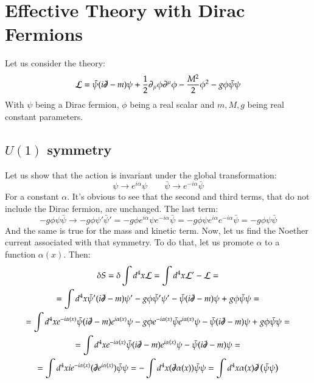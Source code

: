 \documentclass{article}
\begin{document}
\section{Effective Theory with Dirac Fermions}
Let us consider the theory:
\begin{equation}
    \mathcal{L} = \bar{\psi}(i \slashed{\partial} - m)\psi + \frac{1}{2}\partial_\mu\phi\partial^\mu\phi - \frac{M^2}{2}\phi^2 - g\phi\bar{\psi}\psi
\end{equation}
With $\psi$ being a Dirac fermion, $\phi$ being a real scalar and $m, M, g$ being real constant parameters.

\subsection{$U(1)$ symmetry}
Let us show that the action is invariant under the global transformation:
\begin{equation}
    \psi \rightarrow e^{i\alpha}\psi
    \qquad
    \bar{\psi} \rightarrow e^{-i\alpha}\bar{\psi}
\end{equation}
For a constant $\alpha$. It's obvious to see that the second and third terms, that do not include the Dirac fermion, are unchanged. The last term:
\begin{equation}
    -g\phi\psi\bar{\psi} \rightarrow -g\phi\psi'\bar{\psi}' = -g\phi e^{i\alpha}\psi e^{-i\alpha}\bar{\psi} = -g\phi\psi e^{i\alpha} e^{-i\alpha}\bar{\psi} = -g\phi\psi\bar{\psi}
\end{equation}
And the same is true for the mass and kinetic term. Now, let us find the Noether current associated with that symmetry. To do that, let us promote $\alpha$ to a function $\alpha(x)$. Then:
\begin{equation}
\begin{gathered}
    \delta S = \delta \int d^4x \mathcal{L} = \int d^4x \mathcal{L}' - \mathcal{L} = \\ =
    \int d^4x \bar{\psi}'(i \slashed{\partial} - m)\psi' - g\phi\bar{\psi}'\psi' - \bar{\psi}(i \slashed{\partial} - m)\psi + g\phi\bar{\psi}\psi = \\ =
    \int d^4x e^{-i\alpha(x)}\bar{\psi}(i \slashed{\partial} - m)e^{i\alpha(x)}\psi - g\phi e^{-i\alpha(x)}\bar{\psi}e^{i\alpha(x)}\psi - \bar{\psi}(i \slashed{\partial} - m)\psi + g\phi\bar{\psi}\psi = \\ =
    \int d^4x e^{-i\alpha(x)}\bar{\psi}(i \slashed{\partial} - m)e^{i\alpha(x)}\psi - \bar{\psi}(i \slashed{\partial} - m)\psi = \\ =
    \int d^4x i  e^{-i\alpha(x)}(\slashed{\partial} e^{i\alpha(x)})\bar{\psi}\psi =
    - \int d^4x (\slashed{\partial}\alpha(x))\bar{\psi}\psi =
    \int d^4x \alpha(x)\slashed{\partial}\left(\bar{\psi}\psi\right)
\end{gathered}
\end{equation}
\end{document}
